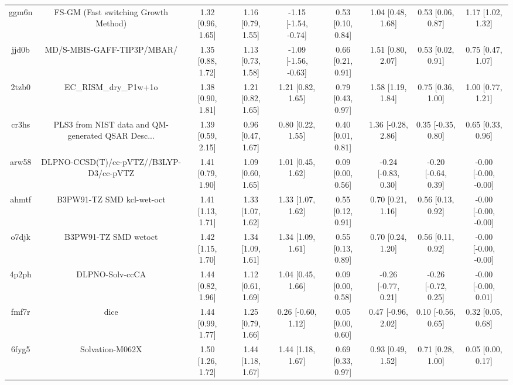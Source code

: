 \documentclass{article}
\begin{document}
\begin{center}
\begin{longtable}{|ccccccccc|}
 ggm6n &               FS-GM (Fast switching Growth Method) &  1.32 [0.96, 1.65] &  1.16 [0.79, 1.55] &  -1.15 [-1.54, -0.74] &  0.53 [0.10, 0.84] &    1.04 [0.48, 1.68] &    0.53 [0.06, 0.87] &     1.17 [1.02, 1.32] \\
 jjd0b &                         MD/S-MBIS-GAFF-TIP3P/MBAR/ &  1.35 [0.88, 1.72] &  1.13 [0.73, 1.58] &  -1.09 [-1.56, -0.63] &  0.66 [0.21, 0.91] &    1.51 [0.80, 2.07] &    0.53 [0.02, 0.91] &     0.75 [0.47, 1.07] \\
 2tzb0 &                              EC\_RISM\_dry\_P1w+1o &  1.38 [0.90, 1.81] &  1.21 [0.82, 1.65] &     1.21 [0.82, 1.65] &  0.79 [0.43, 0.97] &    1.58 [1.19, 1.84] &    0.75 [0.36, 1.00] &     1.00 [0.77, 1.21] \\
 cr3hs &  PLS3 from NIST data and QM-generated QSAR Desc... &  1.39 [0.59, 2.15] &  0.96 [0.47, 1.67] &     0.80 [0.22, 1.55] &  0.40 [0.01, 0.81] &   1.36 [-0.28, 2.86] &   0.35 [-0.35, 0.80] &     0.65 [0.33, 0.96] \\
 arw58 &            DLPNO-CCSD(T)/cc-pVTZ//B3LYP-D3/cc-pVTZ &  1.41 [0.79, 1.90] &  1.09 [0.60, 1.65] &     1.01 [0.45, 1.62] &  0.09 [0.00, 0.56] &  -0.24 [-0.83, 0.30] &  -0.20 [-0.64, 0.39] &  -0.00 [-0.00, -0.00] \\
 ahmtf &                          B3PW91-TZ SMD kcl-wet-oct &  1.41 [1.13, 1.71] &  1.33 [1.07, 1.62] &     1.33 [1.07, 1.62] &  0.55 [0.12, 0.91] &    0.70 [0.21, 1.16] &    0.56 [0.13, 0.92] &  -0.00 [-0.00, -0.00] \\
 o7djk &                               B3PW91-TZ SMD wetoct &  1.42 [1.15, 1.70] &  1.34 [1.09, 1.61] &     1.34 [1.09, 1.61] &  0.55 [0.13, 0.89] &    0.70 [0.24, 1.20] &    0.56 [0.11, 0.92] &  -0.00 [-0.00, -0.00] \\
 4p2ph &                                    DLPNO-Solv-ccCA &  1.44 [0.82, 1.96] &  1.12 [0.61, 1.69] &     1.04 [0.45, 1.66] &  0.09 [0.00, 0.58] &  -0.26 [-0.77, 0.21] &  -0.26 [-0.72, 0.25] &   -0.00 [-0.00, 0.01] \\
 fmf7r &                                               dice &  1.44 [0.99, 1.77] &  1.25 [0.79, 1.66] &    0.26 [-0.60, 1.12] &  0.05 [0.00, 0.60] &   0.47 [-0.96, 2.02] &   0.10 [-0.56, 0.65] &     0.32 [0.05, 0.68] \\
 6fyg5 &                                    Solvation-M062X &  1.50 [1.26, 1.72] &  1.44 [1.18, 1.67] &     1.44 [1.18, 1.67] &  0.69 [0.33, 0.97] &    0.93 [0.49, 1.52] &    0.71 [0.28, 1.00] &     0.05 [0.00, 0.17] \\

\end{longtable}
\end{center}
\end{document}
